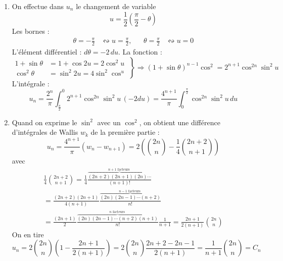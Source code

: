\begin{enumerate}
\begin{enumerate}
  \item On effectue dans $u_n$ le changement de variable
\begin{displaymath}
  u= \frac{1}{2}\left(\frac{\pi}{2} - \theta \right) 
\end{displaymath}
Les bornes :
\begin{align*}
  \theta = -\frac{\pi}{2} &\leftrightsquigarrow  u = \frac{\pi}{2}, 
& &
  \theta = \frac{\pi}{2} &\leftrightsquigarrow  u = 0
\end{align*}
L'élément différentiel : $d\theta = -2\,du$.\newline
La fonction :
\begin{displaymath}
\left.
\begin{aligned}
1+\sin \theta &= 1+ \cos 2u = 2\cos^2 u\\  
\cos^2\theta &= \sin^2 2u= 4\sin^2\cos^ u
\end{aligned}
\right\rbrace 
\Rightarrow
(1+\sin \theta)^{n-1}\cos^2
= 2^{n+1} \cos^{2n} \sin^2u
\end{displaymath}
L'intégrale :
\begin{displaymath}
u_n = \frac{2^n}{\pi}\int_{\frac{\pi}{2}}^{0}2^{n+1}\cos^{2n} \sin^2u\,(-2du)
= \frac{4^{n+1}}{\pi}\int_{0}^{\frac{\pi}{2}}\cos^{2n} \sin^2u\,du
\end{displaymath}

  \item Quand on exprime le $\sin^2$ avec un $\cos^2$, on obtient une différence d'intégrales de Wallis $w_k$ de la première partie :
\begin{displaymath}
u_n=\frac{4^{n+1}}{\pi} (w_n - w_{n+1})
=2\left( \binom{2n}{n} - \frac{1}{4}\binom{2n+2}{n+1}\right) 
\end{displaymath}
avec
\begin{multline*}
\frac{1}{4}\binom{2n+2}{n+1}
=\frac{1}{4} \frac{\overset{n+1 \text{ facteurs }}{\overbrace{(2n+2)(2n+1)(2n)\cdots}}}{(n+1)!}\\
= \frac{(2n+2)(2n+1)}{4(n+1)} \frac{\overset{n-1 \text{ facteurs }}{\overbrace{(2n)(2n-1)\cdots(n+2)}}}{n!}\\
= \frac{(2n+1)}{2} \frac{\overset{n \text{ facteurs }}{\overbrace{(2n)(2n-1)\cdots(n+2)(n+1)}}}{n!}\frac{1}{n+1}
=\frac{2n+1}{2(n+1)}\binom{2n}{n}
\end{multline*}
On en tire
\begin{displaymath}
u_n = 2\binom{2n}{n}\left(1- \frac{2n+1}{2(n+1)}\right)
=2\binom{2n}{n}\frac{2n+2-2n-1}{2(n+1)}
= \frac{1}{n+1}\binom{2n}{n} = C_n
\end{displaymath}


\end{enumerate}
\end{enumerate}
